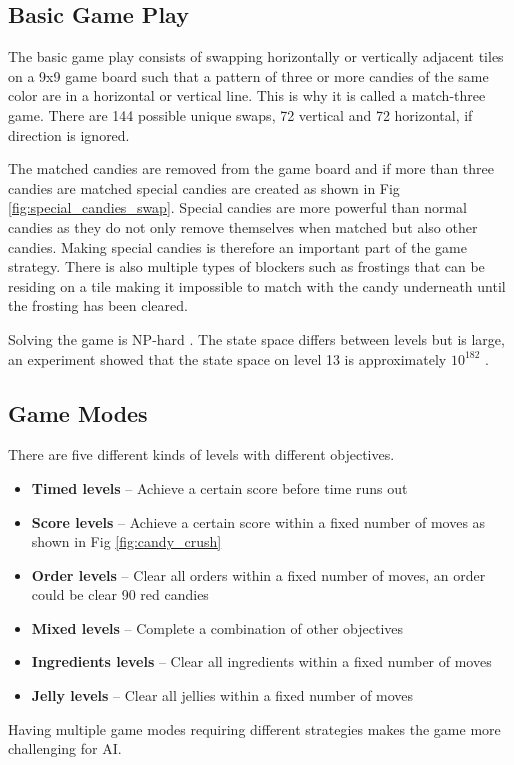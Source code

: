\documentclass{kththesis}
\begin{document}
\subsection{Basic Game Play}
The basic game play consists of swapping  horizontally  or vertically adjacent tiles on a 9x9 game board such that a pattern of three or more candies of the same color are in a horizontal or vertical line. This is why it is called a match-three game. There are 144 possible unique swaps, 72 vertical and 72 horizontal, if direction is ignored.


The matched candies are removed from the game board  and if more than three candies are matched special candies are created as shown in Fig \ref{fig:special_candies_swap}. Special candies are more powerful than normal candies as they do not only remove themselves when matched but also other candies. Making special candies is therefore an important part of the game strategy. There is also multiple types of blockers  such as frostings  that can be residing on a tile making it impossible to match with the candy underneath until the frosting has been cleared.

Solving the game is NP-hard \cite{DBLP:journals/corr/Walsh14}. The state space differs between levels but is large, an experiment showed that the state space on level 13 is approximately $10^{182}$ \cite{poromaa2016}.


\subsection{Game Modes}
There are five different kinds of levels with different objectives.

\begin{itemize}
\item \textbf{Timed levels} – Achieve a certain score before time runs out 
\item \textbf{Score levels} – Achieve a certain score within a fixed number of moves  as shown in Fig \ref{fig:candy_crush}
\item \textbf{Order levels} – Clear all orders within a fixed number of moves, an order could be clear 90 red candies
\item \textbf{Mixed levels} – Complete a combination of other objectives 
\item \textbf{Ingredients levels} – Clear all ingredients within a fixed number of moves
\item \textbf{Jelly levels} – Clear all jellies within a fixed number of moves
\end{itemize}
Having multiple game modes requiring different strategies makes the game more challenging for AI.
\end{document}
